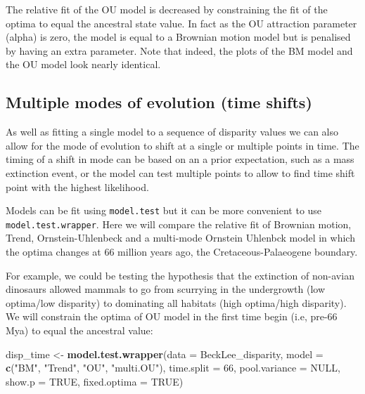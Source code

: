 \documentclass[]{book}
\newenvironment{Shaded}{\begin{snugshade}}{\end{snugshade}}
\newcommand{\DataTypeTok}[1]{\textcolor[rgb]{0.13,0.29,0.53}{#1}}
\newcommand{\DecValTok}[1]{\textcolor[rgb]{0.00,0.00,0.81}{#1}}
\newcommand{\KeywordTok}[1]{\textcolor[rgb]{0.13,0.29,0.53}{\textbf{#1}}}
\newcommand{\NormalTok}[1]{#1}
\newcommand{\OtherTok}[1]{\textcolor[rgb]{0.56,0.35,0.01}{#1}}
\newcommand{\StringTok}[1]{\textcolor[rgb]{0.31,0.60,0.02}{#1}}
\begin{document}
The relative fit of the OU model is decreased by constraining the fit of the optima to equal the ancestral state value.
In fact as the OU attraction parameter (alpha) is zero, the model is equal to a Brownian motion model but is penalised by having an extra parameter.
Note that indeed, the plots of the BM model and the OU model look nearly identical.

\hypertarget{multiple-modes-of-evolution-time-shifts}{%
\subsection{Multiple modes of evolution (time shifts)}\label{multiple-modes-of-evolution-time-shifts}}

As well as fitting a single model to a sequence of disparity values we can also allow for the mode of evolution to shift at a single or multiple points in time.
The timing of a shift in mode can be based on an a prior expectation, such as a mass extinction event, or the model can test multiple points to allow to find time shift point with the highest likelihood.

Models can be fit using \texttt{model.test} but it can be more convenient to use \texttt{model.test.wrapper}.
Here we will compare the relative fit of Brownian motion, Trend, Ornstein-Uhlenbeck and a multi-mode Ornstein Uhlenbck model in which the optima changes at 66 million years ago, the Cretaceous-Palaeogene boundary.

For example, we could be testing the hypothesis that the extinction of non-avian dinosaurs allowed mammals to go from scurrying in the undergrowth (low optima/low disparity) to dominating all habitats (high optima/high disparity).
We will constrain the optima of OU model in the first time begin (i.e, pre-66 Mya) to equal the ancestral value:

\begin{Shaded}
\begin{Highlighting}[]
\NormalTok{disp_time <-}\StringTok{ }\KeywordTok{model.test.wrapper}\NormalTok{(}\DataTypeTok{data =}\NormalTok{ BeckLee_disparity,}
                        \DataTypeTok{model =} \KeywordTok{c}\NormalTok{(}\StringTok{"BM"}\NormalTok{, }\StringTok{"Trend"}\NormalTok{, }\StringTok{"OU"}\NormalTok{, }\StringTok{"multi.OU"}\NormalTok{),}
                                \DataTypeTok{time.split =} \DecValTok{66}\NormalTok{,}
                                \DataTypeTok{pool.variance =} \OtherTok{NULL}\NormalTok{,}
                                \DataTypeTok{show.p =} \OtherTok{TRUE}\NormalTok{,}
                                \DataTypeTok{fixed.optima =} \OtherTok{TRUE}\NormalTok{)}
\end{Highlighting}
\end{Shaded}
\end{document}
